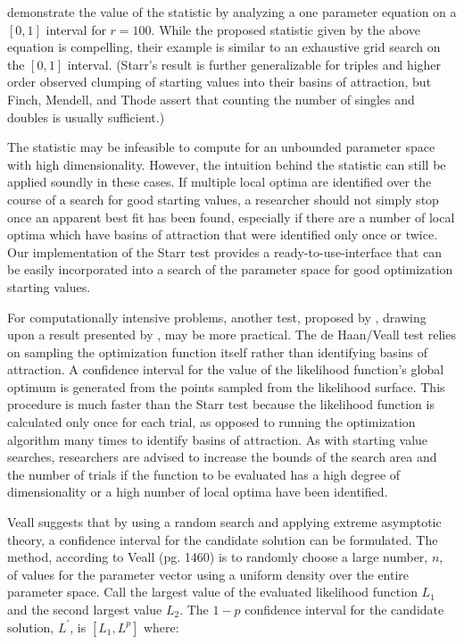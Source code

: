 \documentclass[11pt]{article}
\begin{document}
\citet{FinMenTho89} demonstrate the value of the
statistic by analyzing a one parameter equation on a $[0,1]$
interval for $r = 100$. While the proposed statistic given by the
above equation is compelling, their example is similar to an
exhaustive grid search on the $[0,1]$ interval. 
(Starr's result is further generalizable for triples and
higher order observed clumping of starting values into their
basins of attraction, but Finch, Mendell, and Thode assert that
counting the number of singles and doubles is usually sufficient.)

The statistic may be infeasible to compute for an unbounded parameter space with 
high dimensionality. However, the intuition behind the statistic
can still be applied soundly in these cases. If multiple local optima are identified over the
course of a search for good starting values, a researcher should
not simply stop once an apparent best fit has been found,
especially if there are a number of local optima which have basins
of attraction that were identified only once or twice. Our implementation
of the Starr test provides a ready-to-use-interface that can be 
easily incorporated into a search of the parameter space for good optimization 
starting values.

For computationally intensive problems, another test, proposed by \citet{Veall90}, drawing upon a 
result presented by \citet{deHaan81}, may be more practical. The de Haan/Veall test relies on
 sampling the optimization function itself rather than
identifying basins of attraction. A confidence interval for 
the value of the likelihood function's global optimum is generated from
the points sampled from the likelihood surface. This procedure is much faster than the Starr
test because the likelihood function is calculated only once for each 
trial, as opposed to running the optimization algorithm many times to identify basins of attraction. As with starting value searches, researchers are
advised to increase the bounds of the search area and the number
of trials if the function to be evaluated has a high degree of
dimensionality or a high number of local optima have been
identified.

Veall suggests that by using a random search and applying extreme asymptotic theory, a confidence interval for the candidate
solution can be formulated. The method, according to Veall (pg. 
1460) is to randomly choose a large number, $n$, of values for the
parameter vector using a uniform density over the entire parameter
space. Call the largest value of the evaluated likelihood function
$L_1$ and the second largest value $L_2$. The $1-p$ confidence
interval for the candidate solution, $L^{'}$, is $[L_1,L^p]$
where:
\end{document}
